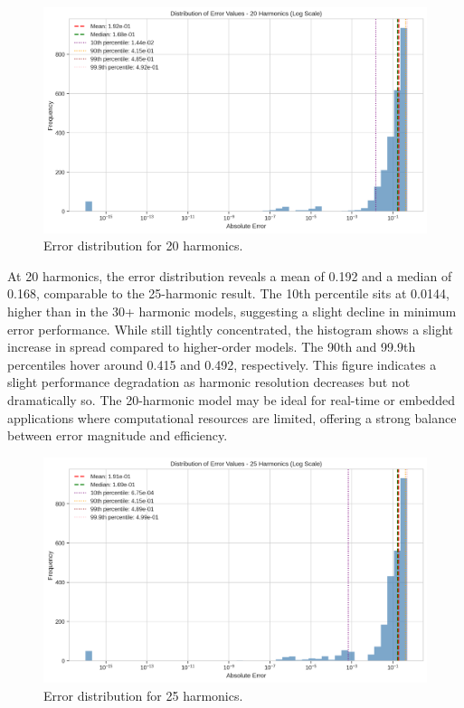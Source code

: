 \documentclass[preprint,12pt]{elsarticle}
\begin{document}
\begin{figure}[t]
    \centering
    \includegraphics[width=0.9\linewidth]{figures/error_distribution_20h.png}
    \caption{Error distribution for 20 harmonics.}
    \label{fig:error_20h}
\end{figure}

At 20 harmonics, the error distribution reveals a mean of 0.192 and a median of 0.168, comparable to the 25-harmonic result. The 10th percentile sits at 0.0144, higher than in the 30+ harmonic models, suggesting a slight decline in minimum error performance. While still tightly concentrated, the histogram shows a slight increase in spread compared to higher-order models. The 90th and 99.9th percentiles hover around 0.415 and 0.492, respectively. This figure indicates a slight performance degradation as harmonic resolution decreases but not dramatically so. The 20-harmonic model may be ideal for real-time or embedded applications where computational resources are limited, offering a strong balance between error magnitude and efficiency.

\begin{figure}[t]
    \centering
    \includegraphics[width=0.9\linewidth]{figures/error_distribution_25h.png}
    \caption{Error distribution for 25 harmonics.}
    \label{fig:error_25h}
\end{figure}
\end{document}
